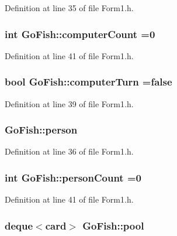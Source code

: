 Definition at line 35 of file Form1.\+h.

\hypertarget{namespace_go_fish_a9e05ca6eb20a4dbd5eedd1ed0540de91}{
\subsubsection[{computer\+Count}]{\setlength{\rightskip}{0pt plus 5cm}int Go\+Fish\+::computer\+Count =0}}\label{namespace_go_fish_a9e05ca6eb20a4dbd5eedd1ed0540de91}


Definition at line 41 of file Form1.\+h.

\hypertarget{namespace_go_fish_a1e5e3f29ab64f86a067ee143e1ca2996}{
\subsubsection[{computer\+Turn}]{\setlength{\rightskip}{0pt plus 5cm}bool Go\+Fish\+::computer\+Turn =false}}\label{namespace_go_fish_a1e5e3f29ab64f86a067ee143e1ca2996}


Definition at line 39 of file Form1.\+h.

\hypertarget{namespace_go_fish_ad4928743b77010f80388ae5f5495bb1b}{
\subsubsection[{person}]{ Go\+Fish\+::person}}\label{namespace_go_fish_ad4928743b77010f80388ae5f5495bb1b}


Definition at line 36 of file Form1.\+h.

\hypertarget{namespace_go_fish_a678c54ee6f4ee2d5eb6ddc8922c1f38d}{
\subsubsection[{person\+Count}]{\setlength{\rightskip}{0pt plus 5cm}int Go\+Fish\+::person\+Count =0}}\label{namespace_go_fish_a678c54ee6f4ee2d5eb6ddc8922c1f38d}


Definition at line 41 of file Form1.\+h.

\hypertarget{namespace_go_fish_aac69982a27bedb89f2ec4a108be9e7c1}{
\subsubsection[{pool}]{\setlength{\rightskip}{0pt plus 5cm}deque$<${\bf card}$>$ Go\+Fish\+::pool}}\label{namespace_go_fish_aac69982a27bedb89f2ec4a108be9e7c1}


